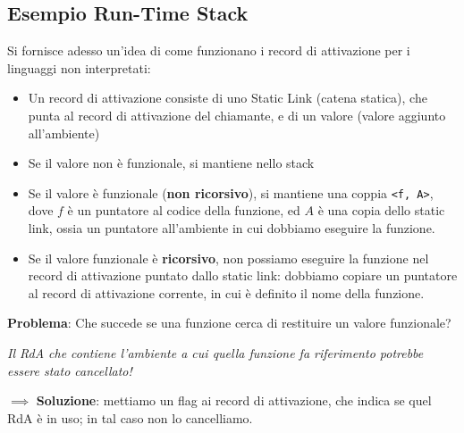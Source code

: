 \documentclass[a4paper,10pt]{article}
\begin{document}
\subsection*{Esempio Run-Time Stack}
Si fornisce adesso un'idea di come funzionano i record di attivazione per i linguaggi non interpretati:

\begin{itemize}
 \item Un record di attivazione consiste di uno Static Link (catena statica), che punta al record di attivazione del chiamante, e di un valore (valore aggiunto all'ambiente)
 \item Se il valore non è funzionale, si mantiene nello stack
 \item Se il valore è funzionale (\textbf{non ricorsivo}), si mantiene una coppia \texttt{<f, A>}, dove $f$ è un puntatore al codice della funzione, ed $A$ è una copia dello static link, ossia un puntatore all'ambiente in cui dobbiamo eseguire la funzione.
 \item Se il valore funzionale è \textbf{ricorsivo}, non possiamo eseguire la funzione nel record di attivazione puntato dallo static link: dobbiamo copiare un puntatore al record di attivazione corrente, in cui è definito il nome della funzione.
\end{itemize}

\textbf{Problema}: Che succede se una funzione cerca di restituire un valore funzionale?\smallskip

\emph{Il RdA che contiene l'ambiente a cui quella funzione fa riferimento potrebbe essere stato cancellato!} 

$\implies$ \textbf{Soluzione}: mettiamo un flag ai record di attivazione, che indica se quel RdA è in uso; in tal caso non lo cancelliamo.
\end{document}
